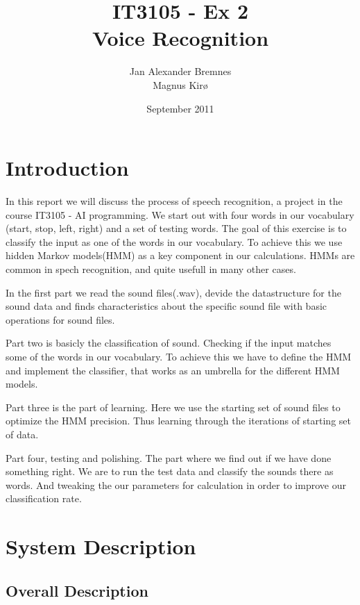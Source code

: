 \documentclass[titlepage]{article}
\author{Jan Alexander Bremnes\\Magnus Kirø}
\title{IT3105 - Ex 2\\Voice Recognition}
\date{September 2011}
\begin{document}
    \maketitle
    \tableofcontents
    \graphicspath{{SRS/img/}}
    \newpage

\section{Introduction}
In this report we will discuss the process of speech recognition, a project in the course IT3105 - AI programming. We start out with four words in our vocabulary (start, stop, left, right) and a set of testing words. The goal of this exercise is to classify the input as one of the words in our vocabulary. To achieve this we use hidden Markov models(HMM) as a key component in our calculations. HMMs are common in spech recognition, and quite usefull in many other cases. 

In the first part we read the sound files(.wav), devide the datastructure for the sound data and finds characteristics about the specific sound file with basic operations for sound files. 

Part two is basicly the classification of sound. Checking if the input matches some of the words in our vocabulary. To achieve this we have to define the HMM and implement the classifier, that works as an umbrella for the different HMM models. 

Part three is the part of learning. Here we use the starting set of sound files to optimize the HMM precision. Thus learning through the iterations of starting set of data. 

Part four, testing and polishing. The part where we find out if we have done something right. We are to run the test data and classify the sounds there as words. And tweaking the our parameters for calculation in order to improve our classification rate.  

\section{System Description}

\subsection{Overall Description}
\end{document}
